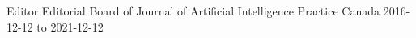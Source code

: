 


\begin{cvhonors}




\cvhonor
{Editor} %
{Editorial Board of Journal of Artificial Intelligence Practice} %
{Canada} %
{2016-12-12 to 2021-12-12} %



\end{cvhonors}
